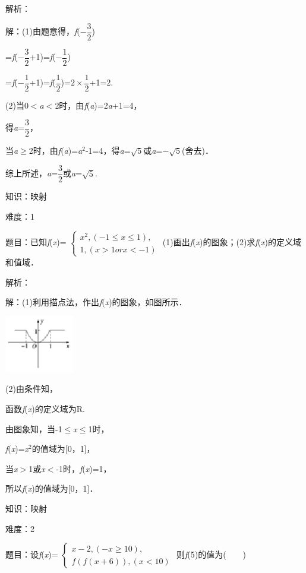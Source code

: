 \documentclass{article} %
\begin{document}
解析：

解：(1)由题意得，\textit{f}($-\dfrac{3}{2}$)

=\textit{f}($-\dfrac{3}{2}$+1)=\textit{f}($-\dfrac{1}{2}$)

=\textit{f}($-\dfrac{1}{2}$+1)=\textit{f}($\dfrac{1}{2}$)=$2\times \dfrac{1}{2}$+1=2.

(2)当0$\mathrm{<}$\textit{a}$\mathrm{<}$2时，由\textit{f}(\textit{a})=2\textit{a}+1=4，

得\textit{a}=$\dfrac{3}{2}$，

当\textit{a}$\mathrm{\ge}$2时，由\textit{f}(\textit{a})=\textit{a}${}^{2}$-1=4，得\textit{a}=$\sqrt{5}$或\textit{a}=$-\sqrt{5}$(舍去)．

综上所述，\textit{a}=$\dfrac{3}{2}$或\textit{a}=$\sqrt{5}$.

知识：映射

难度：1

题目：已知\textit{f}(\textit{x})=
$\left\{
\begin{array}{l}
	x^{2},(-1\le x \le1),\\
	1, (x>1 or x<-1)
\end{array}
\right.$
(1)画出\textit{f}(\textit{x})的图象；(2)求\textit{f}(\textit{x})的定义域和值域．

解析：

解：(1)利用描点法，作出\textit{f}(\textit{x})的图象，如图所示．

\includegraphics*[width=1.19in, height=0.98in, keepaspectratio=false]{image32}

(2)由条件知，

函数\textit{f}(\textit{x})的定义域为R.

由图象知，当-1$\mathrm{\le}$\textit{x}$\mathrm{\le}$1时，

\textit{f}(\textit{x})=\textit{x}${}^{2}$的值域为[0，1]，

当\textit{x}$\mathrm{>}$1或\textit{x}$\mathrm{<}$-1时，\textit{f}(\textit{x})=1，

所以\textit{f}(\textit{x})的值域为[0，1]．

知识：映射

难度：2

题目：设\textit{f}(\textit{x})=
$\left\{
\begin{array}{l}
	x-2,(-x\ge 10),\\
	f(f(x+6)), (x<10)
\end{array}
\right.$
则\textit{f}(5)的值为(　　)
\end{document}
